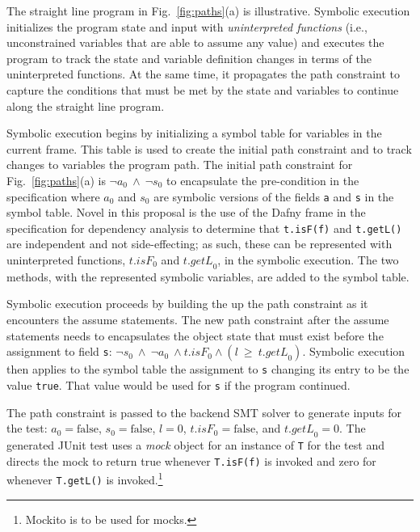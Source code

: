 \documentclass[11pt,onecolumn,notitlepage]{article}
\newcommand{\figref}[1]{Fig.~\ref{#1}}
\begin{document}
The straight line program in \figref{fig:paths}(a) is illustrative. Symbolic execution initializes the program state and input with \emph{uninterpreted functions} (i.e., unconstrained variables that are able to assume any value) and executes the program to track the state and variable definition changes in terms of the uninterpreted functions. At the same time, it propagates the path constraint to capture the conditions that must be met by the state and variables to continue along the straight line program.

Symbolic execution begins by initializing a symbol table for variables in the current frame. This table is used to create the initial path constraint and to track changes to variables the program path. The initial path constraint for \figref{fig:paths}(a) is $\neg a_0\ \wedge\ \neg s_0$ to encapsulate the pre-condition in the specification where $a_0$ and $s_0$ are symbolic versions of the fields \texttt{a} and \texttt{s} in the symbol table. Novel in this proposal is the use of the Dafny frame in the specification for dependency analysis to determine that \texttt{t.isF(f)} and \texttt{t.getL()} are independent and not side-effecting; as such, these can be represented with uninterpreted functions, $\mathit{t.isF}_0$ and $\mathit{t.getL}_0$, in the symbolic execution. The two methods, with the represented symbolic variables, are added to the symbol table.

Symbolic execution proceeds by building the up the path constraint as it encounters the assume statements. The new path constraint after the assume statements needs to encapsulates the object state that must exist before the assignment to field \texttt{s}: $\neg s_0\ \wedge\ \neg a_0\ \wedge \mathit{t.isF}_0 \wedge (l\ \ge\ \mathit{t.getL}_0)$. Symbolic execution then applies to the symbol table the assignment to \texttt{s} changing its entry to be the value \texttt{true}. That value would be used for \texttt{s} if the program continued.

The path constraint is passed to the backend SMT solver to generate inputs for the test: $a_0 = \mathrm{false}$, $s_0 = \mathrm{false}$, $\mathit{l} = 0$, $\mathit{t.isF}_0 = \mathrm{false}$, and $\mathit{t.getL}_0 = 0$. The generated JUnit test uses a \emph{mock} object for an instance of \texttt{T} for the test and directs the mock to return true whenever \texttt{T.isF(f)} is invoked and zero for whenever \texttt{T.getL()} is invoked.\footnote{Mockito is to be used for mocks.} 
\end{document}
